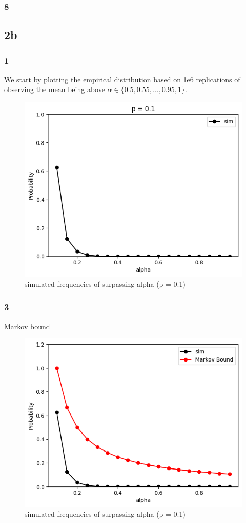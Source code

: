 \documentclass[a4paper,12pt]{article}
\begin{document}
\subsubsection*{8}


\subsection*{2b}
\subsubsection*{1}
We start by plotting the empirical distribution based on 1e6 replications of observing the mean being above $\alpha \in \{0.5, 0.55,\dots , 0.95, 1\}$.

\begin{figure}[htbp]
    \centering
    \includegraphics[width=0.5\linewidth]{HA2_2a_21.png}
    \caption{simulated frequencies of surpassing alpha (p = 0.1)} %
    \label{fig:p01}
\end{figure}


\subsubsection*{3}
Markov bound
\begin{figure}[htbp]
    \centering
    \includegraphics[width=0.5\linewidth]{HA2_2a_22.png}
    \caption{simulated frequencies of surpassing alpha (p = 0.1)} %
    \label{fig:p01}
\end{figure}
\end{document}
